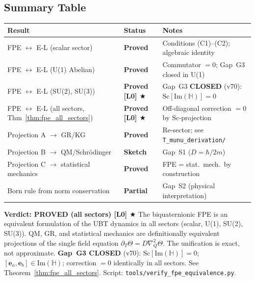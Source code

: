 \documentclass[12pt,a4paper]{article}
\theoremstyle{definition}
\theoremstyle{remark}
\begin{document}
\subsection{Summary Table}
\label{subsec:summary}

\begin{center}
\begin{tabular}{lll}
  \toprule
  \textbf{Result} & \textbf{Status} & \textbf{Notes} \\
  \midrule
  FPE $\leftrightarrow$ E-L (scalar sector) & \textcolor{green!60!black}{\textbf{Proved}} &
    Conditions (C1)--(C2); algebraic identity \\
  FPE $\leftrightarrow$ E-L (U(1) Abelian) & \textcolor{green!60!black}{\textbf{Proved}} &
    Commutator $= 0$; Gap~G3 closed in U(1) \\
  FPE $\leftrightarrow$ E-L (SU(2), SU(3)) & \textcolor{green!60!black}{\textbf{Proved [L0] $\bigstar$}} &
    Gap~G3 \textbf{CLOSED} (v70): $\mathrm{Sc}[\mathrm{Im}(\mathbb{H})]=0$ \\
  FPE $\leftrightarrow$ E-L (all sectors, Thm~\ref{thm:fpe_all_sectors}) &
    \textcolor{green!60!black}{\textbf{Proved [L0] $\bigstar$}} &
    Off-diagonal correction $= 0$ by $\mathrm{Sc}$-projection \\
  Projection A $\to$ GR/KG & \textcolor{green!60!black}{\textbf{Proved}} &
    Re-sector; see \texttt{T\_munu\_derivation/} \\
  Projection B $\to$ QM/Schr\"{o}dinger & \textbf{Sketch} &
    Gap~S1 ($D=\hbar/2m$) \\
  Projection C $\to$ statistical mechanics & \textcolor{green!60!black}{\textbf{Proved}} &
    FPE = stat.~mech.\ by construction \\
  Born rule from norm conservation & \textbf{Partial} &
    Gap~S2 (physical interpretation) \\
  \bottomrule
\end{tabular}
\end{center}

\begin{resultbox}
\textbf{Verdict: PROVED (all sectors) [L0] $\bigstar$}
The biquaternionic FPE is an equivalent formulation of the UBT dynamics
in all sectors (scalar, U(1), SU(2), SU(3)).
QM, GR, and statistical mechanics are definitionally equivalent projections
of the single field equation $\partial_T\Theta = D\nabla_Q^2\Theta$.
The unification is exact, not approximate.
\textbf{Gap~G3 CLOSED} (v70): $\mathrm{Sc}[\mathrm{Im}(\mathbb{H})]=0$;
$[\mathbf{e}_a,\mathbf{e}_b] \in \mathrm{Im}(\mathbb{H})$;
correction $= 0$ identically in all sectors.
See Theorem~\ref{thm:fpe_all_sectors}.
Script: \texttt{tools/verify\_fpe\_equivalence.py}.
\end{resultbox}
\end{document}
